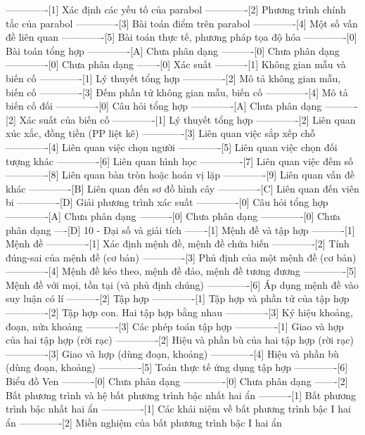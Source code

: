 -------------[1] Xác định các yếu tố của parabol
-------------[2] Phương trình chính tắc của parabol
-------------[3] Bài toán điểm trên parabol
-------------[4] Một số vấn đề liên quan
-------------[5] Bài toán thực tế, phương pháp tọa độ hóa
-------------[0] Bài toán tổng hợp
-------------[A] Chưa phân dạng
----------[0] Chưa phân dạng
-------------[0] Chưa phân dạng
-------[0] Xác suất
----------[1] Không gian mẫu và biến cố
-------------[1] Lý thuyết tổng hợp
-------------[2] Mô tả không gian mẫu, biến cố
-------------[3] Đếm phần tử không gian mẫu, biến cố
-------------[4] Mô tả biến cố đối
-------------[0] Câu hỏi tổng hợp
-------------[A] Chưa phân dạng
----------[2] Xác suất của biến cố
-------------[1] Lý thuyết tổng hợp
-------------[2] Liên quan xúc xắc, đồng tiền (PP liệt kê)
-------------[3] Liên quan việc sắp xếp chỗ
-------------[4] Liên quan việc chọn người
-------------[5] Liên quan việc chọn đối tượng khác
-------------[6] Liên quan hình học
-------------[7] Liên quan việc đếm số
-------------[8] Liên quan bàn tròn hoặc hoán vị lặp
-------------[9] Liên quan vấn đề khác
-------------[B] Liên quan đến sơ đồ hình cây
-------------[C] Liên quan đến viên bi
-------------[D] Giải phương trình xác suất
-------------[0] Câu hỏi tổng hợp
-------------[A] Chưa phân dạng
----------[0] Chưa phân dạng
-------------[0] Chưa phân dạng
----[D] 10 - Đại số và giải tích
-------[1] Mệnh đề và tập hợp
----------[1] Mệnh đề
-------------[1] Xác định mệnh đề, mệnh đề chứa biến
-------------[2] Tính đúng-sai của mệnh đề (cơ bản)
-------------[3] Phủ định của một mệnh đề (cơ bản)
-------------[4] Mệnh đề kéo theo, mệnh đề đảo, mệnh đề tương đương
-------------[5] Mệnh đề với mọi, tồn tại (và phủ định chúng)
-------------[6] Áp dụng mệnh đề vào suy luận có lí
----------[2] Tập hợp
-------------[1] Tập hợp và phần tử của tập hợp
-------------[2] Tập hợp con. Hai tập hợp bằng nhau
-------------[3] Ký hiệu khoảng, đoạn, nửa khoảng
----------[3] Các phép toán tập hợp
-------------[1] Giao và hợp của hai tập hợp (rời rạc)
-------------[2] Hiệu và phần bù của hai tập hợp (rời rạc)
-------------[3] Giao và hợp (dùng đoạn, khoảng)
-------------[4] Hiệu và phần bù (dùng đoạn, khoảng)
-------------[5] Toán thực tế ứng dụng tập hợp
-------------[6] Biểu đồ Ven
----------[0] Chưa phân dạng
-------------[0] Chưa phân dạng
-------[2] Bất phương trình và hệ bất phương trình bậc nhất hai ẩn
----------[1] Bất phương trình bậc nhất hai ẩn
-------------[1] Các khái niệm về bất phương trình bậc I hai ẩn
-------------[2] Miền nghiệm của bất phương trình bậc I hai ẩn
